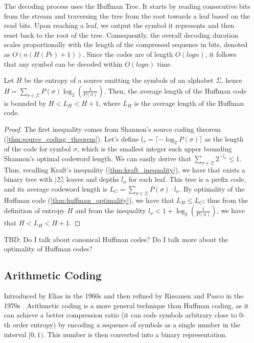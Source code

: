 The decoding process uses the Huffman Tree. It starts by reading consecutive bits from the stream and traversing the tree from the root towards a leaf based on the read bits. Upon reaching a leaf, we output the symbol it represents and then reset back to the root of the tree. Consequently, the overall decoding duration scales proportionally with the length of the compressed sequence in bits, denoted as $O(n(H(Pr) + 1))$. Since the codes are of length $O(log n)$, it follows that any symbol can be decoded within $O(log n)$ time.

\begin{theorem}
    Let $H$ be the entropy of a source emitting the symbols of an alphabet $\Sigma$, hence $H = \sum_{\sigma \in \Sigma} P(\sigma)\log_2\left(\frac{1}{P(\sigma)}\right)$. Then, the average length of the Huffman code is bounded by $H < L_H < H + 1$, where $L_H$ is the average length of the Huffman code.
\end{theorem}
\begin{proof}
    The first inequality comes from Shannon's source coding theorem (\autoref{thm:source_coding_theorem}). Let's define $l_\sigma = \lceil -\log_2 P(\sigma) \rceil$ as the length of the code for symbol $\sigma$, which is the smallest integer such upper bounding Shannon's optimal codeword length. We can easily derive that $\sum_{\sigma \in \Sigma} 2^{-l_\sigma} \leq 1$. Thus, recalling Kraft's inequality (\autoref{thm:kraft_inequality}), we have that exists a binary tree with $|\Sigma|$ leaves and depths $l_\sigma$ for each leaf. This tree is a prefix code, and its average codeword length is $L_C = \sum_{\sigma \in \Sigma} P(\sigma) \cdot l_\sigma$. By optimality of the Huffman code (\ref{thm:huffman_optimality}), we have that $L_H \leq L_C$; thus from the definition of entropy $H$ and from the inequality $l_\sigma < 1 + \log_2\left(\frac{1}{P(\sigma)}\right)$, we have that $H < L_H < H + 1$.
\end{proof}

TBD: Do I talk about canonical Huffman codes? Do I talk more about the optimality of Huffman codes?

\subsection{Arithmetic Coding}

Introduced by Elias in the 1960s and then refined by Rissanen and Pasco in the 1970s \cite{pasco1976source}. Arithmetic coding is a more general technique than Huffman coding, as it can achieve a better compression ratio (it can code symbols arbitrary close to 0-th order entropy) by encoding a sequence of symbols as a single number in the interval $[0,1)$. This number is then converted into a binary representation. \vspace{0.4cm}


